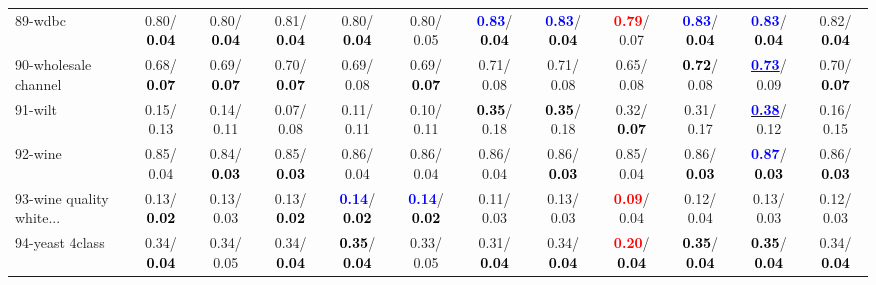 \begin{table}[h]
\begin{center}
{\begin{tabular}{lc|c|c|c|c|c|c|c|c|c|c}
89-wdbc &   0.80/\textcolor{black}{\textbf{  0.04}} &   0.80/\textcolor{black}{\textbf{  0.04}} &   0.81/\textcolor{black}{\textbf{  0.04}} &   0.80/\textcolor{black}{\textbf{  0.04}} &   0.80/  0.05 & \textcolor{blue}{\textbf{  0.83}}/\textcolor{black}{\textbf{  0.04}} & \textcolor{blue}{\textbf{  0.83}}/\textcolor{black}{\textbf{  0.04}} & \textcolor{red}{\textbf{  0.79}}/  0.07 & \textcolor{blue}{\textbf{  0.83}}/\textcolor{black}{\textbf{  0.04}} & \textcolor{blue}{\textbf{  0.83}}/\textcolor{black}{\textbf{  0.04}} &   0.82/\textcolor{black}{\textbf{  0.04}} \\
90-wholesale channel &   0.68/\textcolor{black}{\textbf{  0.07}} &   0.69/\textcolor{black}{\textbf{  0.07}} &   0.70/\textcolor{black}{\textbf{  0.07}} &   0.69/  0.08 &   0.69/\textcolor{black}{\textbf{  0.07}} &   0.71/  0.08 &   0.71/  0.08 &   0.65/  0.08 & \textcolor{black}{\textbf{  0.72}}/  0.08 & \underline{\textcolor{blue}{\textbf{  0.73}}}/  0.09 &   0.70/\textcolor{black}{\textbf{  0.07}} \\
91-wilt &   0.15/  0.13 &   0.14/  0.11 &   0.07/  0.08 &   0.11/  0.11 &   0.10/  0.11 & \textcolor{black}{\textbf{  0.35}}/  0.18 & \textcolor{black}{\textbf{  0.35}}/  0.18 &   0.32/\textcolor{black}{\textbf{  0.07}} &   0.31/  0.17 & \underline{\textcolor{blue}{\textbf{  0.38}}}/  0.12 &   0.16/  0.15 \\
92-wine &   0.85/  0.04 &   0.84/\textcolor{black}{\textbf{  0.03}} &   0.85/\textcolor{black}{\textbf{  0.03}} &   0.86/  0.04 &   0.86/  0.04 &   0.86/  0.04 &   0.86/\textcolor{black}{\textbf{  0.03}} &   0.85/  0.04 &   0.86/\textcolor{black}{\textbf{  0.03}} & \textcolor{blue}{\textbf{  0.87}}/\textcolor{black}{\textbf{  0.03}} &   0.86/\textcolor{black}{\textbf{  0.03}} \\ \hline
93-wine quality white... &   0.13/\textcolor{black}{\textbf{  0.02}} &   0.13/  0.03 &   0.13/\textcolor{black}{\textbf{  0.02}} & \textcolor{blue}{\textbf{  0.14}}/\textcolor{black}{\textbf{  0.02}} & \textcolor{blue}{\textbf{  0.14}}/\textcolor{black}{\textbf{  0.02}} &   0.11/  0.03 &   0.13/  0.03 & \textcolor{red}{\textbf{  0.09}}/  0.04 &   0.12/  0.04 &   0.13/  0.03 &   0.12/  0.03 \\
94-yeast 4class &   0.34/\textcolor{black}{\textbf{  0.04}} &   0.34/  0.05 &   0.34/\textcolor{black}{\textbf{  0.04}} & \textcolor{black}{\textbf{  0.35}}/\textcolor{black}{\textbf{  0.04}} &   0.33/  0.05 &   0.31/\textcolor{black}{\textbf{  0.04}} &   0.34/\textcolor{black}{\textbf{  0.04}} & \textcolor{red}{\textbf{  0.20}}/\textcolor{black}{\textbf{  0.04}} & \textcolor{black}{\textbf{  0.35}}/\textcolor{black}{\textbf{  0.04}} & \textcolor{black}{\textbf{  0.35}}/\textcolor{black}{\textbf{  0.04}} &   0.34/\textcolor{black}{\textbf{  0.04}} \\\end{tabular}}\label{stratsALCKappa2aELMRedux}
\end{center}
\end{table}
